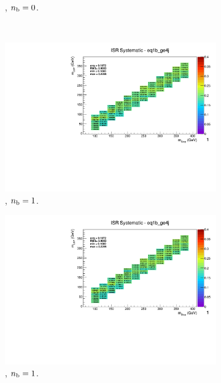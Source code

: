 \begin{figure}[ht!]
\begin{subfigure}[b]{0.32\textwidth}
    \caption{\njhigh, $n_{\text{b}} = 0$.}
  \end{subfigure}\\
  \begin{subfigure}[b]{0.32\textwidth}
    \includegraphics[width=\textwidth, page=14]{Figs/sms/t2degen/v19_3/systs/T2_4body_ISR_eq1b_ge4j.pdf}
    \caption{\njhigh, $n_{\text{b}} = 1$.}
  \end{subfigure}
  \begin{subfigure}[b]{0.32\textwidth}
    \includegraphics[width=\textwidth, page=9]{Figs/sms/t2degen/v19_3/systs/T2_4body_ISR_eq1b_ge4j.pdf}
    \caption{\njhigh, $n_{\text{b}} = 1$.}
  \end{subfigure}
  \begin{subfigure}[b]{0.32\textwidth}

\end{subfigure}
\end{figure}
